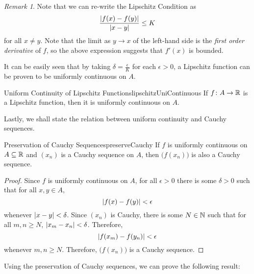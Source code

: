 \documentclass[math]{amznotes}
\theoremstyle{remark}
\newtheorem*{remark}{Remark}
\begin{document}
\begin{notebox}
    \begin{remark}
        Note that we can re-write the Lipschitz Condition as
        \begin{equation*}
            \frac{{\left\lvert {f(x) - f(y)} \right\rvert}}{{\left\lvert {x - y} \right\rvert}} \leq K
        \end{equation*}
        for all $x \neq y$. Note that the limit as $y \to x$ of the left-hand side is the \textit{first order derivative} of $f$, so the above expression suggests that $f'(x)$ is bounded.
    \end{remark}
\end{notebox}
It can be easily seen that by taking $\delta = \frac{\epsilon}{K}$ for each $\epsilon > 0$, a Lipschitz function can be proven to be uniformly continuous on $A$.
\begin{thmbox}{Uniform Continuity of Lipschitz Functions}{lipschitzUniContinuous}
    If $f \colon A \to \mathbb{R}$ is a Lipschitz function, then it is uniformly continuous on $A$.
\end{thmbox}
Lastly, we shall state the relation between uniform continuity and Cauchy sequences.
\begin{thmbox}{Preservation of Cauchy Sequences}{preserveCauchy}
    If $f$ is uniformly continuous on $A \subseteq \mathbb{R}$ and $(x_n)$ is a Cauchy sequence on $A$, then $\bigl(f(x_n)\bigr)$ is also a Cauchy sequence.
    \tcblower
    \begin{proof}
        Since $f$ is uniformly continuous on $A$, for all $\epsilon > 0$ there is some $\delta > 0$ such that for all $x, y \in A$,
        \begin{equation*}
            {\left\lvert {f(x) - f(y)} \right\rvert} < \epsilon
        \end{equation*}
        whenever ${\left\lvert {x - y} \right\rvert} < \delta$. Since $(x_n)$ is Cauchy, there is some $N \in \mathbb{N}$ such that for all $m, n \geq N$, ${\left\lvert {x_m - x_n} \right\rvert} < \delta$. Therefore,
        \begin{equation*}
            {\left\lvert {f(x_m) - f(y_n)} \right\rvert} < \epsilon
        \end{equation*}
        whenever $m, n \geq N$. Therefore, $\bigl(f(x_n)\bigr)$ is a Cauchy sequence.
    \end{proof}
\end{thmbox}
Using the preservation of Cauchy sequences, we can prove the following result:
\end{document}

